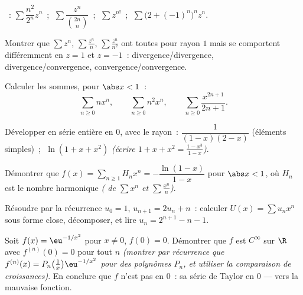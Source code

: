 \begin{exercise}[$\star$]\label{exo:b2:powerseries:1}
~:
$\sum \dfrac{n^2}{2^n}z^n$~; $\;\sum \dfrac{z^n}{\binom{2n}{n}}$~;
$\;\sum z^{n!}$~; $\;\sum \bigl(2 + (-1)^n\bigr)^n z^n$.
\end{exercise}

\begin{exercise}[$\star$]\label{exo:b2:powerseries:2}
Montrer que $\sum z^n$, $\sum \frac{z^n}{n}$, $\sum \frac{z^n}{n^2}$
ont toutes pour rayon $1$ mais se comportent différemment en $z = 1$ et $z = -1$~:
divergence/divergence, divergence/convergence,
convergence/convergence.
\end{exercise}

\begin{exercise}[$\star$]\label{exo:b2:powerseries:3}
Calculer les sommes, pour $\abs x < 1$~:
\[
\sum_{n\geq0} n x^n,
\qquad
\sum_{n\geq0} n^2 x^n,
\qquad
\sum_{n\geq0} \frac{x^{2n+1}}{2n+1} .
\]
\end{exercise}

\begin{exercise}[$\star\star$]\label{exo:b2:powerseries:4}
Développer en série entière en $0$, avec le rayon~: $\dfrac{1}{(1-x)(2-x)}$
(éléments simples)~; $\;\ln(1 + x + x^2)$ \emph{(écrire $1 + x + x^2
= \frac{1 - x^3}{1 - x}$)}.
\end{exercise}

\begin{exercise}[$\star\star$]\label{exo:b2:powerseries:5}
Démontrer que $f(x) = \sum_{n\geq1} H_n x^n = -\dfrac{\ln(1 -
x)}{1 - x}$ pour $\abs x < 1$, où $H_n$ est le nombre harmonique
\emph{( de $\sum x^n$ et $\sum \frac{x^n}{n}$)}.
\end{exercise}

\begin{exercise}[$\star\star$]\label{exo:b2:powerseries:6}
Résoudre par  la récurrence $u_0 = 1$, $u_{n+1} =
2u_n + n$~: calculer $U(x) = \sum u_nx^n$ sous forme close, décomposer,
et lire $u_n = 2^{n+1} - n - 1$.
\end{exercise}

\begin{exercise}[$\star\star$]\label{exo:b2:powerseries:7}
Soit $f(x) = \eu^{-1/x^2}$ pour $x \neq 0$, $f(0) = 0$. Démontrer que
$f$ est $C^\infty$ sur $\R$ avec $f^{(n)}(0) = 0$ pour tout $n$
\emph{(montrer par récurrence que $f^{(n)}(x) = P_n\bigl(\frac1x\bigr)
\eu^{-1/x^2}$ pour des polynômes $P_n$, et utiliser la comparaison de
croissances)}. En conclure que $f$ n'est pas  en $0$~: sa
série de Taylor en $0$  --- vers la mauvaise fonction.
\end{exercise}

